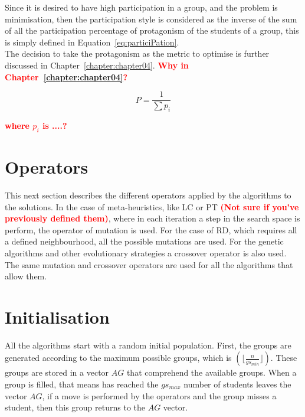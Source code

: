 Since it is desired to have high participation in a group, and the problem is minimisation, then the participation style is considered as the inverse of the sum of all the participation percentage of protagonism of the students of a group, this is simply defined in Equation~\ref{eq:particiPation}.\\

The decision to take the protagonism as the metric to optimise is further discussed in Chapter~\ref{chapter:chapter04}. \textcolor{red}{\bf Why in Chapter~\ref{chapter:chapter04}?}

\begin{equation}
    \label{eq:particiPation}
    P = \frac{1}{\sum p_i} 
\end{equation}

\textcolor{red}{\bf where $p_i$ is ....?}

\section{Operators} \label{sec:operators}

This next section describes the different operators applied by the algorithms to the solutions. In the case of meta-heuristics, like LC or PT \textcolor{red}{\bf(Not sure if you've previously defined them)}, where in each iteration a step in the search space is perform, the operator of mutation is used. For the case of RD, which requires all a defined neighbourhood, all the possible mutations are used. For the genetic algorithms and other evolutionary strategies a crossover operator is also used. The same mutation and crossover operators are used for all the algorithms that allow them.\\

\section{Initialisation}

All the algorithms start with a random initial population. First, the groups are generated according to the maximum possible groups, which is $(\lfloor\frac{n}{gs_{min}}\rfloor)$. These groups are stored in a vector $AG$ that comprehend the available groups. When a group is filled, that means has reached the $gs_{max}$ number of students leaves the vector $AG$, if a move is performed by the operators and the group misses a student, then this group returns to the $AG$ vector.\\

